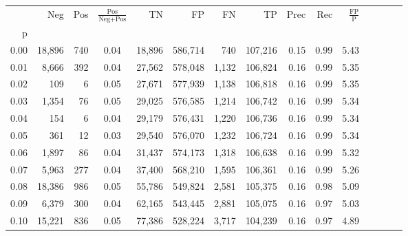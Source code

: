 \begin{tabular}{rrrcrrrrrrrrrrr}
\toprule
{} &     Neg &    Pos & $\frac{\text{Pos}}{\text{Neg}+\text{Pos}}$ &       TN &       FP &       FN &       TP &  Prec &   Rec & $\frac{\text{FP}}{\text{P}}$ \\
p    &         &        &                                            &          &          &          &          &       &       &                              \\
\midrule
0.00 &  18,896 &    740 &                                       0.04 &   18,896 &  586,714 &      740 &  107,216 &  0.15 &  0.99 &                         5.43 \\
0.01 &   8,666 &    392 &                                       0.04 &   27,562 &  578,048 &    1,132 &  106,824 &  0.16 &  0.99 &                         5.35 \\
0.02 &     109 &      6 &                                       0.05 &   27,671 &  577,939 &    1,138 &  106,818 &  0.16 &  0.99 &                         5.35 \\
0.03 &   1,354 &     76 &                                       0.05 &   29,025 &  576,585 &    1,214 &  106,742 &  0.16 &  0.99 &                         5.34 \\
0.04 &     154 &      6 &                                       0.04 &   29,179 &  576,431 &    1,220 &  106,736 &  0.16 &  0.99 &                         5.34 \\
0.05 &     361 &     12 &                                       0.03 &   29,540 &  576,070 &    1,232 &  106,724 &  0.16 &  0.99 &                         5.34 \\
0.06 &   1,897 &     86 &                                       0.04 &   31,437 &  574,173 &    1,318 &  106,638 &  0.16 &  0.99 &                         5.32 \\
0.07 &   5,963 &    277 &                                       0.04 &   37,400 &  568,210 &    1,595 &  106,361 &  0.16 &  0.99 &                         5.26 \\
0.08 &  18,386 &    986 &                                       0.05 &   55,786 &  549,824 &    2,581 &  105,375 &  0.16 &  0.98 &                         5.09 \\
0.09 &   6,379 &    300 &                                       0.04 &   62,165 &  543,445 &    2,881 &  105,075 &  0.16 &  0.97 &                         5.03 \\
0.10 &  15,221 &    836 &                                       0.05 &   77,386 &  528,224 &    3,717 &  104,239 &  0.16 &  0.97 &                         4.89 \\

\end{tabular}
